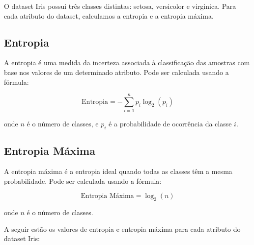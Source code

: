 \documentclass{article}
\begin{document}
O dataset Iris possui três classes distintas: setosa, versicolor e virginica. Para cada atributo do dataset, calculamos a entropia e a entropia máxima.

\subsection{Entropia}

A entropia é uma medida da incerteza associada à classificação das amostras com base nos valores de um determinado atributo. Pode ser calculada usando a fórmula:

\[
\text{Entropia} = - \sum_{i=1}^{n} p_i \log_2(p_i)
\]

onde $n$ é o número de classes, e $p_i$ é a probabilidade de ocorrência da classe $i$.

\subsection{Entropia Máxima}

A entropia máxima é a entropia ideal quando todas as classes têm a mesma probabilidade. Pode ser calculada usando a fórmula:

\[
\text{Entropia Máxima} = \log_2(n)
\]

onde $n$ é o número de classes.

A seguir estão os valores de entropia e entropia máxima para cada atributo do dataset Iris:
\end{document}
